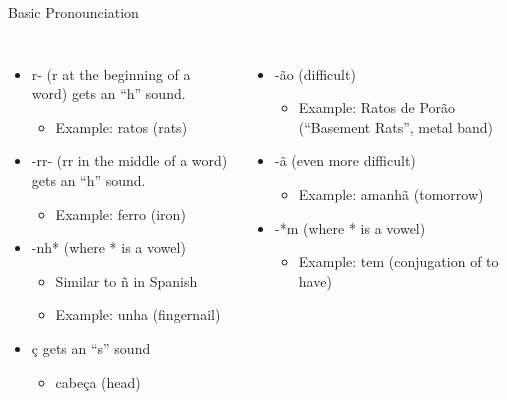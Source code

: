 \begin{frame}
  \titlepage
\end{frame}

\begin{frame}[t]{Basic Pronounciation}
  \begin{columns}
    \begin{itemize}
    \item<1-> r- (r at the beginning of a word) gets an ``h'' sound.
      \begin{itemize}
      \item<1-> Example: ratos (rats)
      \end{itemize}
    \item<2-> -rr- (rr in the middle of a word) gets an ``h'' sound.
      \begin{itemize}
      \item<2-> Example: ferro (iron)
      \end{itemize}
    \item<3-> -nh* (where * is a vowel)
      \begin{itemize}
      \item<3-> Similar to \~n in Spanish
      \item<3-> Example:  unha (fingernail)
      \end{itemize}
    \item<4-> \c{c} gets an ``s'' sound
      \begin{itemize}
      \item<4-> cabe\c{c}a (head)
      \end{itemize}
    \end{itemize}
    \begin{itemize}
    \item<5-> -\~ao (difficult)
      \begin{itemize}
      \item<5-> Example: Ratos de Por\~ao (``Basement Rats'', metal band)
      \end{itemize}
    \item<6-> -\~a (even more difficult)
      \begin{itemize}
        \item<6-> Example: amanh\~a (tomorrow)
      \end{itemize}
    \item<7-> -*m (where * is a vowel)
      \begin{itemize}
      \item<7-> Example: tem (conjugation of to have)
      \end{itemize}
    \end{itemize}
  \end{columns}
\end{frame}

